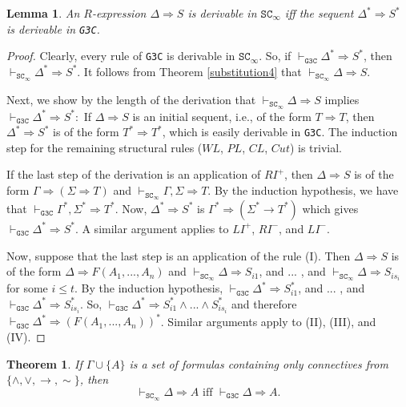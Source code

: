 \documentclass{article}%
\theoremstyle{break}
\newtheorem{theorem}{Theorem}[section]
\newtheorem{lemma}{Lemma}
\begin{document}
\begin{lemma}\label{Lemma}
    An $R$-expression $\Delta\Rightarrow S$ is derivable in $\texttt{SC}_\infty$ iff the sequent $\Delta^*\Rightarrow S^*$ is derivable in \texttt{G3C}.
\end{lemma}
\begin{proof}
    Clearly, every rule of \texttt{G3C} is derivable in $\texttt{SC}_\infty$. So, if $\vdash_{\texttt{G3C}}\Delta^*\Rightarrow S^*$, then $\vdash_{\texttt{SC}_\infty} \Delta^*\Rightarrow S^*$. It follows from Theorem \ref{substitution4} that $\vdash_{\texttt{SC}_\infty} \Delta\Rightarrow S$.

    Next, we show by the length of the derivation that $\vdash_{\texttt{SC}_\infty} \Delta\Rightarrow S$ implies $\vdash_{\texttt{G3C}}\Delta^*\Rightarrow S^*:$ If $\Delta\Rightarrow S$ is an initial sequent, i.e., of the form $T\Rightarrow T$, then $\Delta^* \Rightarrow S^*$ is of the form $T^*\Rightarrow T^*$, 
    which is easily derivable in \texttt{G3C}.
    The induction step for the remaining structural rules ($WL$, $PL$, $CL$, $Cut$) is trivial. 
    
    If the last step of the derivation is an application of $RI^+$, then $\Delta\Rightarrow S$ is of the form  $ \Gamma \Rightarrow (\Sigma \Rightarrow T)$ and $\vdash_{\texttt{SC}_\infty} \Gamma, \Sigma \Rightarrow T$. 
    By the induction hypothesis, we have that $\vdash_{\texttt{G3C}} \Gamma^*, \Sigma^* \Rightarrow T^*$. Now, $\Delta^*\Rightarrow S^*$ is $\Gamma^*\Rightarrow(\Sigma^*\rightarrow T^*)$ which gives $\vdash_{\texttt{G3C}} \Delta^* \Rightarrow S^*$. 
    A similar argument applies to $LI^+$, $RI^-$, and $LI^-$. 

    Now, suppose that the last step is an application of the rule (I). 
    Then $\Delta\Rightarrow S$ is of the form $\Delta \Rightarrow F(A_1,...,A_n)$ and $\vdash_{\texttt{SC}_\infty}\Delta \Rightarrow S_{i 1}$, and ... , and $\vdash_{\texttt{SC}_\infty} \Delta \Rightarrow S_{i s_{i}}$ for some $i\leq t$. 
    By the induction hypothesis, $\vdash_{\texttt{G3C}}\Delta^* \Rightarrow S^*_{i 1}$, and ... , and $\vdash_{\texttt{G3C}} \Delta^* \Rightarrow S^*_{i s_{i}}$. 
    So, $\vdash_{\texttt{G3C}} \Delta^* \Rightarrow S^*_{i 1}\wedge ... \wedge S^*_{i s_{i}}$ and therefore $\vdash_{\texttt{G3C}} \Delta^* \Rightarrow (F(A_1,...,A_n))^*$. 
    Similar arguments apply to (II), (III), and (IV).

\end{proof}

\begin{theorem}
If $\Gamma \cup \{A\}$ is a set of formulas containing only connectives from $\{\wedge, \vee, \rightarrow, {\sim}\} $, then 
    $$\vdash_{\texttt{SC}_\infty} \Delta \Rightarrow A \text{ iff } \vdash_{\texttt{G3C}} \Delta \Rightarrow A .  $$
\end{theorem}
\end{document}
